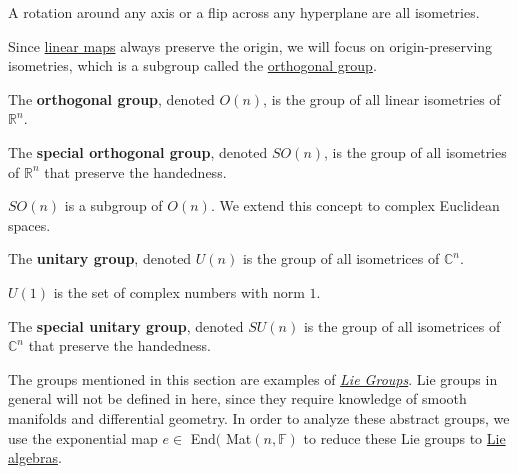   \begin{example}
    \label{ex:rotations-and-reflections-are-isometries}
    A rotation around any axis or a flip across any hyperplane are all isometries. 
  \end{example}

  Since \hyperref[def:linear_map]{linear maps} always preserve the origin, we will focus on origin-preserving isometries, which is a subgroup called the \hyperref[dg-def:orthogonal-group]{orthogonal group}.

  \begin{definition}
    \label{def:orthogonal-group}
		The \textbf{orthogonal group}, denoted $O(n)$, is the group of all linear isometries of $\mathbb{R}^n$. 
  \end{definition}

  \begin{definition}
    \label{def:special-orthogonal-group}
		The \textbf{special orthogonal group}, denoted $SO(n)$, is the group of all isometries of $\mathbb{R}^n$ that preserve the handedness. 
  \end{definition}

	$SO(n)$ is a subgroup of $O(n)$. We extend this concept to complex Euclidean spaces. 

  \begin{definition}
    \label{def:unitary-group}
		The \textbf{unitary group}, denoted $U(n)$ is the group of all isometrices of $\mathbb{C}^n$. 
  \end{definition}

  \begin{example}
    \label{ex:u1-as-the-unit-circle}
    $U(1)$ is the set of complex numbers with norm $1$. 
  \end{example}

  \begin{definition}
    \label{def:special-unitary-group}
		The \textbf{special unitary group}, denoted $SU(n)$ is the group of all isometrices of $\mathbb{C}^n$ that preserve the handedness. 
  \end{definition}

  The groups mentioned in this section are examples of \textit{\hyperref[dg-def:lie-group]{Lie Groups}}. Lie groups in general will not be defined in here, since they require knowledge of smooth manifolds and differential geometry. In order to analyze these abstract groups, we use the exponential map $e \in$ End$($ Mat$(n, \mathbb{F})$ to reduce these Lie groups to \hyperref[dg-def:lie-algebra]{Lie algebras}.

